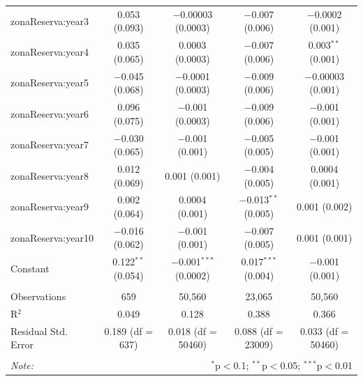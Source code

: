 \documentclass[]{article}
\begin{document}
\begin{table}[!htbp]
\begin{tabular}{@{\extracolsep{1pt}}lcccc}
  zonaReserva:year3 & 0.053 (0.093) & $-$0.00003 (0.0003) & $-$0.007 (0.006) & $-$0.0002 (0.001) \\ 
  zonaReserva:year4 & 0.035 (0.065) & 0.0003 (0.0003) & $-$0.007 (0.006) & 0.003$^{**}$ (0.001) \\ 
  zonaReserva:year5 & $-$0.045 (0.068) & $-$0.0001 (0.0003) & $-$0.009 (0.006) & $-$0.00003 (0.001) \\ 
  zonaReserva:year6 & 0.096 (0.075) & $-$0.001 (0.0003) & $-$0.009 (0.006) & $-$0.001 (0.001) \\ 
  zonaReserva:year7 & $-$0.030 (0.065) & $-$0.001 (0.001) & $-$0.005 (0.005) & $-$0.001 (0.001) \\ 
  zonaReserva:year8 & 0.012 (0.069) & 0.001 (0.001) & $-$0.004 (0.005) & 0.0004 (0.001) \\ 
  zonaReserva:year9 & 0.002 (0.064) & 0.0004 (0.001) & $-$0.013$^{**}$ (0.005) & 0.001 (0.002) \\ 
  zonaReserva:year10 & $-$0.016 (0.062) & $-$0.001 (0.001) & $-$0.007 (0.005) & 0.001 (0.001) \\ 
  Constant & 0.122$^{**}$ (0.054) & $-$0.001$^{***}$ (0.0002) & 0.017$^{***}$ (0.004) & $-$0.001 (0.001) \\ 
 \hline \\[-1.8ex] 
Observations & 659 & 50,560 & 23,065 & 50,560 \\ 
R$^{2}$ & 0.049 & 0.128 & 0.388 & 0.366 \\ 
Residual Std. Error & 0.189 (df = 637) & 0.018 (df = 50460) & 0.088 (df = 23009) & 0.033 (df = 50460) \\ 
\hline 
\hline \\[-1.8ex] 
\textit{Note:}  & \multicolumn{4}{r}{$^{*}$p$<$0.1; $^{**}$p$<$0.05; $^{***}$p$<$0.01} \\ 
\end{tabular} 
\end{table}
\end{document}
